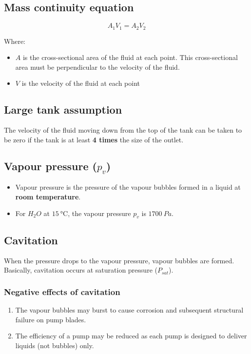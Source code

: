 \documentclass[11pt]{article}
\begin{document}
\subsection{Mass continuity equation}
\label{sec:org3b4afda}
\[A_1 V_1 = A_2 V_2\]

Where:
\begin{itemize}
\item \(A\) is the cross-sectional area of the fluid at each point. This cross-sectional area must be perpendicular to the velocity of the fluid.
\item \(V\) is the velocity of the fluid at each point
\end{itemize}
\subsection{Large tank assumption}
\label{sec:org55aed82}
The velocity of the fluid moving down from the top of the tank can be taken to be zero if the tank is at least \textbf{4 times} the size of the outlet.
\subsection{Vapour pressure (\(p_v\))}
\label{sec:org12a32d1}
\begin{itemize}
\item Vapour pressure is the pressure of the vapour bubbles formed in a liquid at \textbf{room temperature}.
\item For \(H_{2}O\) at \(\qty{15}{\degreeCelsius}\), the vapour pressure \(p_v\) is \(\qty{1700}{Pa}\).
\end{itemize}
\subsection{Cavitation}
\label{sec:orgd1da5fd}
When the pressure drops to the vapour pressure, vapour bubbles are formed. Basically, cavitation occurs at saturation pressure (\(P_{sat}\)).
\subsubsection{Negative effects of cavitation}
\label{sec:orgea5615d}
\begin{enumerate}
\item The vapour bubbles may burst to cause corrosion and subsequent structural failure on pump blades.
\item The efficiency of a pump may be reduced as each pump is designed to deliver liquids (not bubbles) only.
\end{enumerate}
\end{document}
